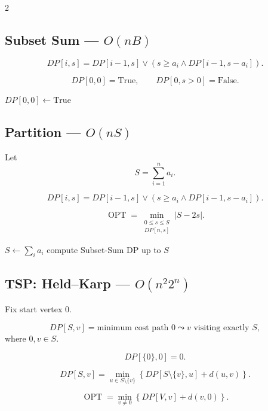 \documentclass[8pt]{extarticle}
\theoremstyle{definition}
\newcommand{\OPT}{\operatorname{OPT}}
\begin{document}
\begin{multicols*}{2}
\subsection{Subset Sum --- $O(nB)$}

\[
DP[i,s]
=
DP[i-1,s]\lor
\left(s\ge a_i\land DP[i-1,s-a_i]\right).
\]

\[
DP[0,0]=\mathrm{True},\qquad
DP[0,s>0]=\mathrm{False}.
\]

\begin{algorithm}[H]
\DontPrintSemicolon
{}
$DP[0,0]\gets \mathrm{True}$\;
\;
\end{algorithm}


\subsection{Partition --- $O(nS)$}

Let
\[
S=\sum_{i=1}^n a_i.
\]

\[
DP[i,s]
=
DP[i-1,s]\lor
\left(s\ge a_i\land DP[i-1,s-a_i]\right).
\]

\[
\OPT
=
\min_{\substack{0\le s\le S\\DP[n,s]}}
|S-2s|.
\]

\begin{algorithm}[H]
\DontPrintSemicolon
{}
$S\gets\sum_i a_i$\;
compute Subset-Sum DP up to $S$\;
\;
\end{algorithm}


\subsection{TSP: Held--Karp --- $O(n^2 2^n)$}

Fix start vertex $0$.

\[
DP[S,v]
=
\text{minimum cost path }0\leadsto v
\text{ visiting exactly }S,
\]
where $0,v\in S$.

\[
DP[\{0\},0]=0.
\]

\[
DP[S,v]
=
\min_{u\in S\setminus\{v\}}
\left\{
DP[S\setminus\{v\},u]+d(u,v)
\right\}.
\]

\[
\OPT
=
\min_{v\ne0}
\left\{
DP[V,v]+d(v,0)
\right\}.
\]


\end{multicols*}
\end{document}
